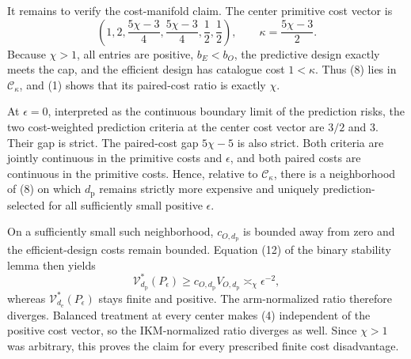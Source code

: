 It remains to verify the cost-manifold claim. The center primitive cost vector is
\[
 \left(1,2,\frac{5\chi-3}{4},\frac{5\chi-3}{4},
 \frac12,\frac12\right),
 \qquad \kappa=\frac{5\chi-3}{2}. \tag{8}
\]
Because \(\chi>1\), all entries are positive, \(b_E<b_O\), the predictive design exactly meets the cap, and the efficient design has catalogue cost \(1<\kappa\). Thus (8) lies in \(\mathcal C_\kappa\), and (1) shows that its paired-cost ratio is exactly \(\chi\).

At \(\epsilon=0\), interpreted as the continuous boundary limit of the prediction risks, the two cost-weighted prediction criteria at the center cost vector are \(3/2\) and \(3\). Their gap is strict. The paired-cost gap \(5\chi-5\) is also strict. Both criteria are jointly continuous in the primitive costs and \(\epsilon\), and both paired costs are continuous in the primitive costs. Hence, relative to \(\mathcal C_\kappa\), there is a neighborhood of (8) on which \(d_{\mathrm p}\) remains strictly more expensive and uniquely prediction-selected for all sufficiently small positive \(\epsilon\).

On a sufficiently small such neighborhood, \(c_{O,d_{\mathrm p}}\) is bounded away from zero and the efficient-design costs remain bounded. Equation (12) of the binary stability lemma then yields
\[
 \mathcal V_{d_{\mathrm p}}^*(P_\epsilon)
 \ge c_{O,d_{\mathrm p}}V_{O,d_{\mathrm p}}
 \asymp_\chi \epsilon^{-2},
\]
whereas \(\mathcal V_{d_{\mathrm e}}^*(P_\epsilon)\) stays finite and positive. The arm-normalized ratio therefore diverges. Balanced treatment at every center makes (4) independent of the positive cost vector, so the IKM-normalized ratio diverges as well. Since \(\chi>1\) was arbitrary, this proves the claim for every prescribed finite cost disadvantage.